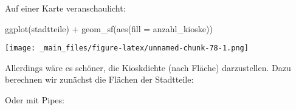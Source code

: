 \documentclass[11pt,german,a4paper]{article}
\newenvironment{Shaded}{\begin{snugshade}}{\end{snugshade}}
\newcommand{\AttributeTok}[1]{\textcolor[rgb]{0.77,0.63,0.00}{#1}}
\newcommand{\DecValTok}[1]{\textcolor[rgb]{0.00,0.00,0.81}{#1}}
\newcommand{\FunctionTok}[1]{\textcolor[rgb]{0.00,0.00,0.00}{#1}}
\newcommand{\NormalTok}[1]{#1}
\newcommand{\OtherTok}[1]{\textcolor[rgb]{0.56,0.35,0.01}{#1}}
\newcommand{\SpecialCharTok}[1]{\textcolor[rgb]{0.00,0.00,0.00}{#1}}
\begin{document}
Auf einer Karte veranschaulicht:

\begin{Shaded}
\begin{Highlighting}[]
\FunctionTok{ggplot}\NormalTok{(stadtteile) }\SpecialCharTok{+}
  \FunctionTok{geom\_sf}\NormalTok{(}\FunctionTok{aes}\NormalTok{(}\AttributeTok{fill =}\NormalTok{ anzahl\_kioske))}
\end{Highlighting}
\end{Shaded}

\texttt{[image: \_main\_files/figure-latex/unnamed-chunk-78-1.png]}

Allerdings wäre es schöner, die Kioskdichte (nach Fläche) darzustellen. Dazu berechnen wir zunächst die Flächen der Stadtteile:

\begin{Shaded}
\end{Shaded}

Oder mit Pipes:
\end{document}
